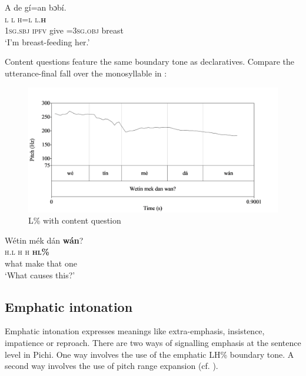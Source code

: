 \ea%
    \label{ex:key:81}
    \gll   \MakeUppercase{A}   de    gí=an    bɔbí.\\
\textsc{l}    \textsc{l}    \textsc{h=l}      \textsc{l.}\textbf{\textsc{h}}\\


\textsc{1sg.sbj}  \textsc{ipfv}    give  =\textsc{3sg.obj}  breast\\

\glt ‘I’m breast-feeding her.’  

\z

Content questions feature the same boundary tone as declaratives. Compare the utterance-final fall over the monosyllable in :

\begin{figure}
\caption{L\% with content question}
\label{fig:key:3.29}
\includegraphics[height=.3\textheight]{figures/yakpomod-img31.png}
\end{figure}

  
 


\ea%
    \label{ex:key:82}
    \gll   Wétin  mék    dán    \textbf{wán}?  \\
\textsc{h.l}    \textsc{h}    \textsc{h}    \textbf{\textsc{hl\%}}      \\
what  make  that    one\\
\glt ‘What causes this?’
\z

\subsection{Emphatic intonation}\label{sec:3.4.2}

Emphatic intonation expresses meanings like extra-emphasis, insistence, impatience or reproach. There are two ways of signalling emphasis at the sentence level in Pichi. One way involves the use of the emphatic LH\% boundary tone. A second way involves the use of pitch range expansion (cf. ).



